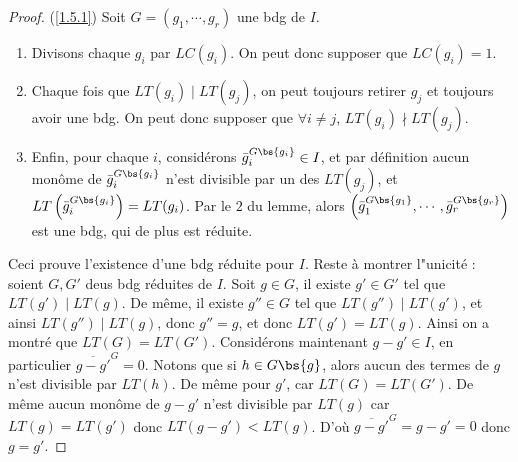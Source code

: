         \begin{proof} (\ref{1.5.1})
            Soit $G = (g_1, \cdots, g_r)$ une bdg de $I$.
            \begin{enumerate}
                \item Divisons chaque $g_i$ par $LC(g_i)$. On peut donc supposer que $LC(g_i) = 1$.
                \item Chaque fois que $LT(g_i) \mid LT(g_j)$, on peut toujours retirer $g_j$ et toujours avoir une bdg. On peut donc supposer que $\forall i \neq j$, $LT(g_i) \nmid LT(g_j)$.
                \item Enfin, pour chaque $i$, considérons $\bar g_i^{G \bs \{g_i\}} \in I$, et par définition aucun monôme de $\bar g_i^{G \bs \{g_i\}}$ n'est divisible par un des $LT(g_j)$, et $LT\left(\bar g_i^{G \bs \{g_i\}}\right) = LT(g_i)$. Par le $2$ du lemme, alors $\left(\bar g_1^{G \bs \{g_1\}}, \cdots, \bar g_r^{G \bs \{g_r\}}\right)$ est une bdg, qui de plus est réduite.
            \end{enumerate}
            Ceci prouve l'existence d'une bdg réduite pour $I$. Reste à montrer l"unicité : soient $G,G'$ deus bdg réduites de $I$. Soit $g \in G$, il existe $g' \in G'$ tel que $LT(g') \mid LT(g)$. De même, il existe $g'' \in G$ tel que $LT(g'') \mid LT(g')$, et ainsi $LT(g'') \mid LT(g)$, donc $g'' = g$, et donc $LT(g') = LT(g)$. Ainsi on a montré que $LT(G) = LT(G')$. Considérons maintenant $g - g' \in I$, en particulier $\overline{g - g'}^G = 0$. Notons que si $h \in G \bs \{g\}$, alors aucun des termes de $g$ n'est divisible par $LT(h)$. De même pour $g'$, car $LT(G) = LT(G')$. De même aucun monôme de $g - g'$ n'est divisible par $LT(g)$ car $LT(g) = LT(g')$ donc $LT(g - g') < LT(g)$. D'où $\overline{g - g'}^G = g- g' = 0$ donc $g = g'$.
        \end{proof}
